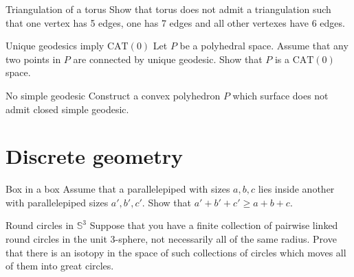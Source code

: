 \documentclass[twoside]{book}
\begin{document}
{\begin{pr}{}{Triangulation of a torus}\label{Triangulation of a torus}
Show that torus does not admit a triangulation 
such that one vertex has 5 edges,
one has 7 edges and 
all other vertexes have 
6 edges. 
\end{pr}

\begin{pr}{\easy}{Unique geodesics imply $\mathrm{CAT}(0)$}\label{Unique geodesics imply CAT}
Let $P$ be a polyhedral space.
Assume that any two points in $P$ 
are connected by unique geodesic.
Show that $P$ is a $\mathrm{CAT}(0)$ space.
\end{pr}

\begin{pr}{\easy}{No simple geodesic}\label{No simple geodesic}
Construct a convex polyhedron $P$ which surface does not admit closed simple geodesic.
\end{pr}





\chapter{Discrete geometry}



\begin{pr}{}{Box in a box}\label{box-in-box} 
Assume that a parallelepiped with sizes $a,b,c$ 
lies inside another with parallelepiped sizes $a',b',c'$. 
Show that $a'+b'+c'\ge a+b+c$.
\end{pr}





\begin{pr}{\easy}{Round circles in $\mathbb{S}^3$}\label{Round circles}
Suppose that you have a finite collection of pairwise linked round circles in the unit 3-sphere, 
not necessarily all of the same radius. 
Prove that there is an isotopy in the space of such collections of circles 
which moves all of them into great circles.
\end{pr}

}
\end{document}
